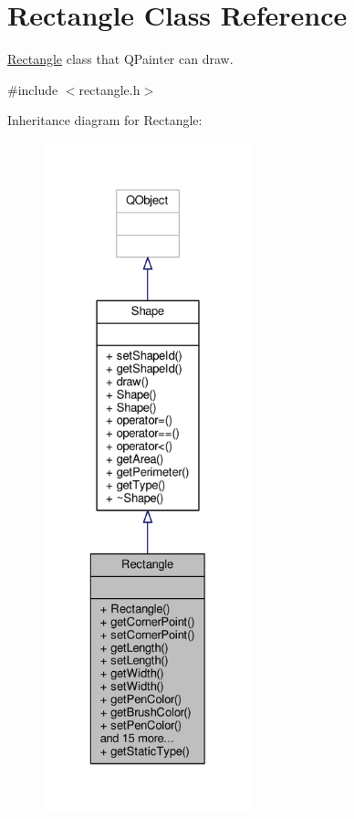 \hypertarget{classRectangle}{}\section{Rectangle Class Reference}
\label{classRectangle}


\hyperlink{classRectangle}{Rectangle} class that Q\+Painter can draw.  




{\ttfamily \#include $<$rectangle.\+h$>$}



Inheritance diagram for Rectangle\+:\nopagebreak
\begin{figure}[H]
\begin{center}
\leavevmode
\includegraphics[height=550pt]{classRectangle__inherit__graph}
\end{center}
\end{figure}


